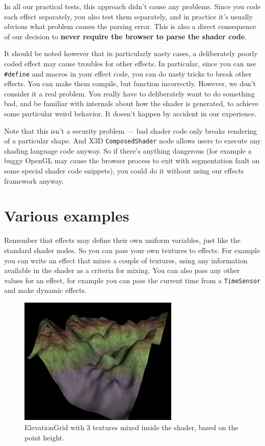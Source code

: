 \documentclass{acmsiggraph}                     %
\begin{document}
In all our practical tests, this approach didn't cause any problems.
Since you code each effect separately, you also test them separately,
and in practice it's usually obvious what problem causes the parsing error.
This is also a direct consequence of our decision to \textbf{never require
the browser to parse the shader code}.

It should be noted however that in particularly nasty cases,
a deliberately poorly coded effect may cause troubles for other effects.
In particular, since you can use \texttt{\#define} and macros in your effect code,
you can do nasty tricks to break other effects. You can make them compile,
but function incorrectly. However, we don't consider
it a real problem. You really have to deliberately want to do something bad,
and be familiar with internals about how the shader is generated,
to achieve some particular weird behavior.
It doesn't happen by accident in our experience.

Note that this isn't a security problem --- bad shader code only breaks
rendering of a particular shape. And X3D \texttt{ComposedShader} node allows users
to execute any shading language code anyway. So if there's anything dangerous
(for example a buggy OpenGL may cause the browser process to exit with
segmentation fault on some special shader code snippets),
you could do it without using our effects framework anyway.

\section{Various examples}

Remember that effects may define their own uniform variables,
just like the standard shader nodes. So you can pass your own textures
to effects. For example you can write an effect that mixes a couple of textures,
using any information available in the shader as a criteria for mixing.
You can also pass any other values for an effect, for example you can
pass the current time from a \texttt{TimeSensor} and make dynamic effects.

\begin{figure}[H]
  \centering
  \includegraphics[width=3in]{terrain}
  \caption{ElevationGrid with 3 textures mixed inside the shader,
based on the point height.}
\end{figure}
\end{document}
